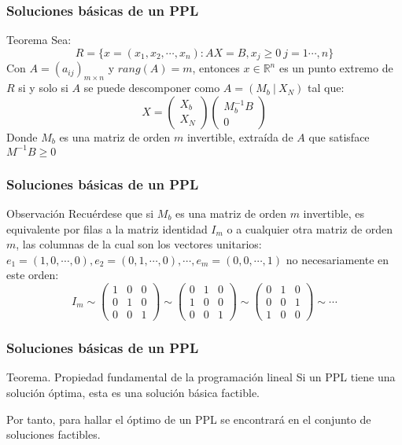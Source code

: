 \documentclass{beamer}
\begin{document}
\begin{frame}
\frametitle{Soluciones b\'asicas de un PPL}
\begin{block}{Teorema}
Sea:
\[R=\{x=(x_1,x_2,\cdots, x_n) : AX=B, x_j\geq 0\ j=1\cdots, n\}\]
Con $A=(a_{ij})_{m\times n}$ y $rang(A) = m$, entonces $x\in \mathbb R^n$ es un punto extremo de $R$ si y solo si $A$ se puede descomponer como $A=(M_b \ | \ X_N)$ tal que:
 \[X = \left(\begin{array}{c}X_b \\X_N\end{array}\right) \left(\begin{array}{c}M_b^{-1} B \\0\end{array}\right) \]
Donde $M_b$ es una matriz de orden $m$ invertible, extra\'ida de $A$ que satisface $M^{-1}B\geq 0$

\end{block}
\end{frame}





\begin{frame}
\frametitle{Soluciones b\'asicas de un PPL}
\begin{block}{Observaci\'on}
Recu\'erdese que si $M_b$ es una matriz de orden $m$ invertible, es equivalente por filas a la matriz identidad $I_m$ o a cualquier otra matriz de orden $m$, las columnas de la cual son los vectores unitarios: $e_1=(1,0,\cdots,0),e_2=(0,1,\cdots,0),\cdots,e_m=(0,0,\cdots,1)$ no necesariamente en este orden:
 \[I_m \sim \left(\begin{array}{ccc}1&0&0 \\0&1&0\\ 0&0&1\end{array}\right)  
 \sim \left(\begin{array}{ccc}0&1&0 \\1&0&0\\ 0&0&1\end{array}\right) 
 \sim \left(\begin{array}{ccc}0&1&0 \\0&0&1\\ 1&0&0\end{array}\right) \sim \cdots\]
\end{block}
\end{frame}



\begin{frame}
\frametitle{Soluciones b\'asicas de un PPL}
\begin{block}{Teorema. Propiedad fundamental de la programaci\'on lineal}
Si un PPL tiene una soluci\'on \'optima, esta es una soluci\'on b\'asica factible. 
\end{block}
Por tanto, para hallar el \'optimo de un PPL se encontrar\'a en el conjunto de soluciones factibles.
\end{frame}
\end{document}
